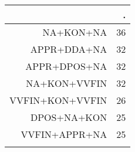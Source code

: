\begin{tabular}{rr}
  \lsptoprule
 & . \\ 
  \midrule
NA+KON+NA &  36 \\ 
  APPR+DDA+NA &  32 \\ 
  APPR+DPOS+NA &  32 \\ 
  NA+KON+VVFIN &  32 \\ 
  VVFIN+KON+VVFIN &  26 \\ 
  DPOS+NA+KON &  25 \\ 
  VVFIN+APPR+NA &  25 \\ 
   \lspbottomrule
\end{tabular}

